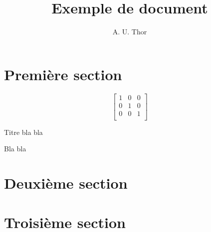\documentclass{sharticle}
\title{Exemple de document}
\author{A. U. Thor}
\begin{document}
\maketitle
\section{Première section}
\[
\begin{bmatrix}
  1 & 0 & 0 \\
  0 & 1 & 0 \\
  0 & 0 & 1 \\
\end{bmatrix}
\]
\begin{pageinsert}
\caption{Titre bla bla}
Bla bla
\end{pageinsert}
\section{Deuxième section}
\section{Troisième section}
\end{document}

